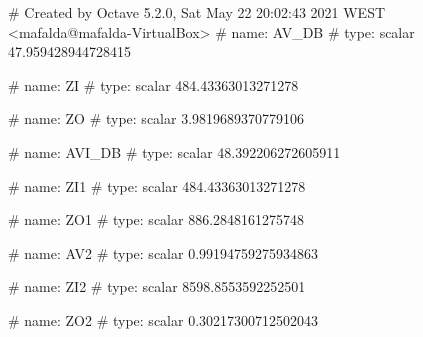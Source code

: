 # Created by Octave 5.2.0, Sat May 22 20:02:43 2021 WEST <mafalda@mafalda-VirtualBox>
# name: AV_DB
# type: scalar
47.959428944728415


# name: ZI
# type: scalar
484.43363013271278


# name: ZO
# type: scalar
3.9819689370779106


# name: AVI_DB
# type: scalar
48.392206272605911


# name: ZI1
# type: scalar
484.43363013271278


# name: ZO1
# type: scalar
886.2848161275748


# name: AV2
# type: scalar
0.99194759275934863


# name: ZI2
# type: scalar
8598.8553592252501


# name: ZO2
# type: scalar
0.30217300712502043


